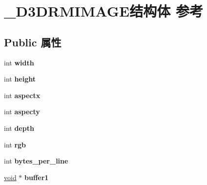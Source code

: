 \hypertarget{struct___d3_d_r_m_i_m_a_g_e}{}\section{\+\_\+\+D3\+D\+R\+M\+I\+M\+A\+G\+E结构体 参考}
\label{struct___d3_d_r_m_i_m_a_g_e}
\subsection*{Public 属性}
\begin{DoxyCompactItemize}
\item 
\mbox{\label{struct___d3_d_r_m_i_m_a_g_e_a8509c50d178cfd12027c7cfe3695ab48}} 
int {\bfseries width}
\item 
\mbox{\label{struct___d3_d_r_m_i_m_a_g_e_a9ad2c7da4d1e7dfa4d15232bcf000c44}} 
int {\bfseries height}
\item 
\mbox{\label{struct___d3_d_r_m_i_m_a_g_e_a7e57fb9d23b6141378cf87c487291a50}} 
int {\bfseries aspectx}
\item 
\mbox{\label{struct___d3_d_r_m_i_m_a_g_e_acc2895d3ac4b33a1527074cb01ca9348}} 
int {\bfseries aspecty}
\item 
\mbox{\label{struct___d3_d_r_m_i_m_a_g_e_aa2af8162384e6df071552a10fe8a8fa7}} 
int {\bfseries depth}
\item 
\mbox{\label{struct___d3_d_r_m_i_m_a_g_e_a634dde5357b743b48fd1e1e4319d0849}} 
int {\bfseries rgb}
\item 
\mbox{\label{struct___d3_d_r_m_i_m_a_g_e_ae4d3e33223a68b4d98cde9352861ce2d}} 
int {\bfseries bytes\+\_\+per\+\_\+line}
\item 
\mbox{\label{struct___d3_d_r_m_i_m_a_g_e_abb1ac97ac7fc37338d9b0a7c171515f5}} 
\hyperlink{interfacevoid}{void} $\ast$ {\bfseries buffer1}
\item 
\mbox{\label{struct___d3_d_r_m_i_m_a_g_e_a35fcce23539a782a0107693c71c30179}} 

\end{DoxyCompactItemize}
